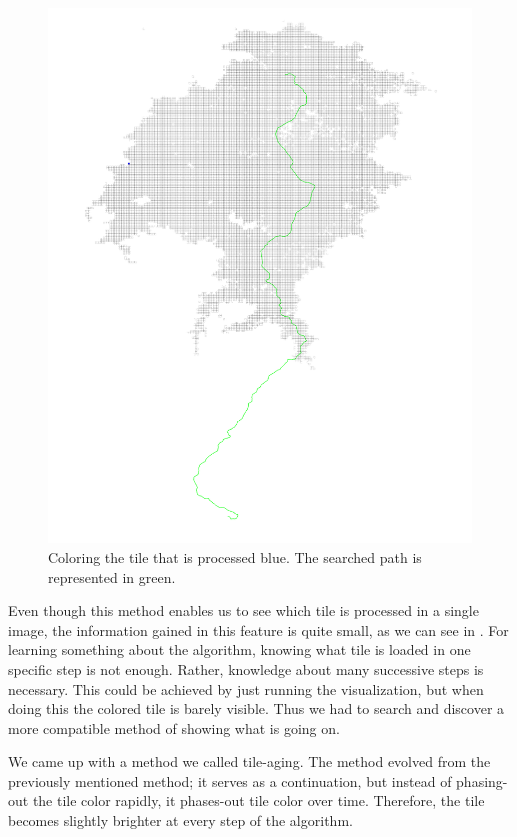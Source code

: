 \documentclass
[
    paper = a4,
    pagesize,
    12 pt,
    oneside,                       %
    open = right,
    DIV = calc,
    BCOR = 0 mm,                   %
    bibtotoc
]
{scrbook}
\begin{document}
\begin{figure}
        \includegraphics[width=\textwidth]{Images/vis-current-tile.png}
\caption[]{Coloring the tile that is processed blue. The searched path is represented in green.}
\label{fig:color_current_tile}
\end{figure}

Even though this method enables us to see which tile is processed in a single image, the information gained in this feature is quite small, as we can see in .
For learning something about the algorithm, knowing what tile is loaded in one specific step is not enough.
Rather, knowledge about many successive steps is necessary.
This could be achieved by just running the visualization, but when doing this the colored tile is barely visible.
Thus we had to search and discover a more compatible method of showing what is going on.

We came up with a method we called tile-aging.
The method evolved from the previously mentioned method; it serves as a continuation, but instead of phasing-out the tile color rapidly, it phases-out tile color over time.
Therefore, the tile becomes slightly brighter at every step of the algorithm.
\end{document}
